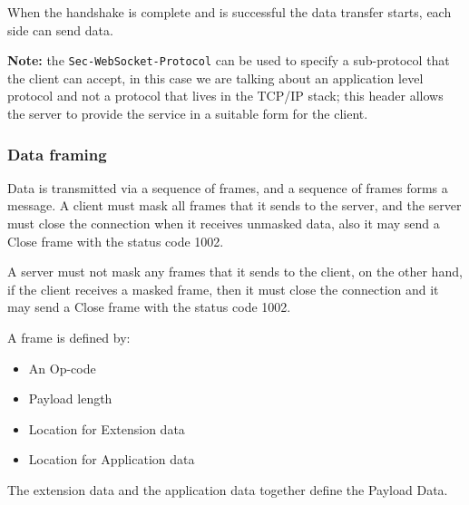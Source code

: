 When the handshake is complete and is successful the data transfer starts, each side can send data.\newline

\textbf{Note:} the \texttt{Sec-WebSocket-Protocol} can be used to specify a sub-protocol that the client can accept, in this case we are talking about an application level protocol and not a protocol that lives in the TCP/IP stack; this header allows the server to provide the service in a suitable form for the client.

\subsubsection{Data framing}
Data is transmitted via a sequence of frames, and a sequence of frames forms a message.\newline
A client must mask all frames that it sends to the server, and the server must close the connection when it receives unmasked data, also it may send a Close frame with the status code 1002.\newline

A server must not mask any frames that it sends to the client, on the other hand, if the client receives a masked frame, then it must close the connection and it may send a Close frame with the status code 1002.\newline

A frame is defined by:
\begin{itemize}
	\item An Op-code
	\item Payload length
	\item Location for Extension data
	\item Location for Application data
\end{itemize}
	
The extension data and the application data together define the Payload Data.

